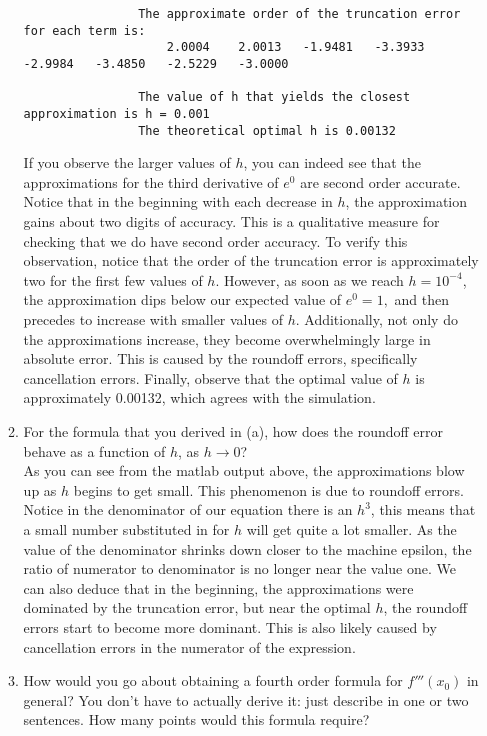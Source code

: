 \documentclass{article}
\begin{document}
\begin{enumerate}[label = \arabic*]
\begin{enumerate}
\begin{verbatim}
				The approximate order of the truncation error for each term is:	
				    2.0004    2.0013   -1.9481   -3.3933   -2.9984   -3.4850   -2.5229   -3.0000
				
				The value of h that yields the closest approximation is h = 0.001
				The theoretical optimal h is 0.00132
			\end{verbatim}
			\color{black}
			
			\hspace{15pt} If you observe the larger values of $h$, you can indeed see that the approximations for the third derivative of $e^0$ are second order accurate. Notice that in the beginning with each decrease in $h$, the approximation gains about two digits of accuracy. This is a qualitative measure for checking that we do have second order accuracy. To verify this observation, notice that the order of the truncation error is approximately two for the first few values of $h$. However, as soon as we reach $h = 10^{-4}$, the approximation dips below our expected value of $e^0 = 1,$ and then precedes to increase with smaller values of $h$. Additionally, not only do the approximations increase, they become overwhelmingly large in absolute error. This is caused by the roundoff errors, specifically cancellation errors. Finally, observe that the optimal value of $h$ is approximately 0.00132, which agrees with the simulation. \\
			
			\item For the formula that you derived in (a), how does the roundoff error behave as a function of $h$, as $h \rightarrow 0$? \\
			
			\hspace{15pt} As you can see from the matlab output above, the approximations blow up as $h$ begins to get small. This phenomenon is due to roundoff errors. Notice in the denominator of our equation there is an $h^3$, this means that a small number substituted in for $h$ will get quite a lot smaller. As the value of the denominator shrinks down closer to the machine epsilon, the ratio of numerator to denominator is no longer near the value one. We can also deduce that in the beginning, the approximations were dominated by the truncation error, but near the optimal $h$, the roundoff errors start to become more dominant. This is also likely caused by cancellation errors in the numerator of the expression. \\
			
			\item How would you go about obtaining a fourth order formula for $f'''(x_0)$ in general? You don't have to actually derive it: just describe in one or two sentences. How many points would this formula require? \\
			

\end{enumerate}
\end{enumerate}
\end{document}

